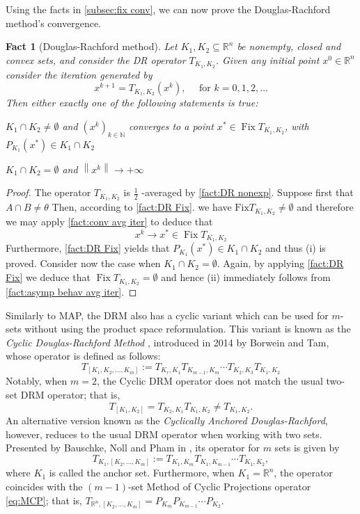 \documentclass[smallextended,numbook,nospthms]{svjour3}
\theoremstyle{plain}
\newtheorem{fact}[theorem]{Fact}
\theoremstyle{definition}
\def\RR{\mathds R}
\def\NN{\mathds N}
\DeclareMathOperator{\Fix}{Fix}
\begin{document}
Using the facts in \cref{subsec:fix conv}, we can now prove the Douglas-Rachford method's convergence.
\begin{fact}[Douglas-Rachford method]\label{fact:DR conv}
Let $K_1, K_2 \subseteq \RR^n$ be nonempty, closed and convex sets, and consider the DR operator $T_{K_1, K_2}$. Given any initial point $x^{0} \in \RR^n$
consider the iteration generated by
\[
x^{k+1}=T_{K_1, K_2}\left(x^{k}\right), \quad \text { for } k=0,1,2, \dots
\]
Then either exactly one of the following statements is true:
\begin{listi}
\item $K_1 \cap K_2 \neq \emptyset$ and $\left(x^{k}\right)_{k \in \NN}$ converges to a point $x^{*} \in \Fix T_{K_1, K_2}$, with $P_{K_1}\left(x^{*}\right) \in K_1 \cap K_2$
\item $K_1 \cap K_2=\emptyset$ and $\left\|x^{k}\right\| \rightarrow+\infty$
\end{listi}
\end{fact}
\begin{proof}
The operator $T_{K_1, K_2}$ is $\frac{1}{2}$ -averaged by \cref{fact:DR nonexp}. Suppose first that $A \cap B \neq \theta$ Then, according to \cref{fact:DR Fix}. we have $\mathrm{Fix} T_{K_1, K_2} \neq \emptyset$ and therefore we may apply \cref{fact:conv avg iter} to deduce that
\[
x^{k} \rightarrow x^{*} \in \operatorname{Fix} T_{K_1, K_2}
\]
Furthermore, \cref{fact:DR Fix} yields that $P_{K_1}\left(x^{*}\right) \in K_1 \cap K_2$ and thus
(i) is proved. Consider now the case when $K_1 \cap K_2=\emptyset$. Again, by applying \cref{fact:DR Fix} we deduce that $\Fix T_{K_1, K_2}=\emptyset$ and hence
(ii) immediately follows from \cref{fact:asymp behav avg iter}.
\end{proof}

Similarly to MAP, the DRM also has a cyclic variant which can be used for $m$-sets without using the product space reformulation. This variant is known as the \emph{Cyclic Douglas-Rachford Method} \cite{Borwein:2014}, introduced in 2014 by Borwein and Tam, whose operator is defined as follows:
\[
T_{\left[K_{1}, K_{2}, \ldots, K_{m}\right]}:=T_{K_{r}, K_{1}} T_{K_{m-1}, K_{m}} \cdots T_{K_{2}, K_{3}} T_{K_{1}, K_{2}}
\]
Notably, when $m=2$, the Cyclic DRM operator does not match the usual two-set DRM operator; that is,
\[
T_{[K_1, K_2]}=T_{K_2, K_1} T_{K_1, K_2} \neq T_{K_1, K_2}.
\]
An alternative version known as the \emph{Cyclically Anchored Douglas-Rachford}, however, reduces to the usual DRM operator when working with two sets. Presented by Bauschke, Noll and Pham in \cite{Bauschke:2015df}, its operator for $m$ sets is given by
\[
T_{K_{1},\left[K_{2}, \ldots, K_{m}\right]}:=T_{K_{1}, K_{m}} T_{K_{1}, K_{m-1}} \cdots T_{K_{1}, K_{2}},
\]
where $K_{1}$ is called the anchor set. Furthermore, when $K_1=\RR^n$, the operator coincides with the $(m-1)$-set Method of Cyclic Projections operator \cref{eq:MCP}; that is, $T_{\RR^n,\left[K_{2}, \ldots, K_{m}\right]}=P_{K_{m}} P_{K_{m-1}} \cdots P_{K_{2}}$.
\end{document}
